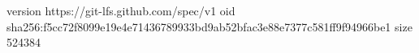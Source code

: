 version https://git-lfs.github.com/spec/v1
oid sha256:f5cc72f8099e19e4e71436789933bd9ab52bfac3e88e7377c581ff9f94966be1
size 524384

